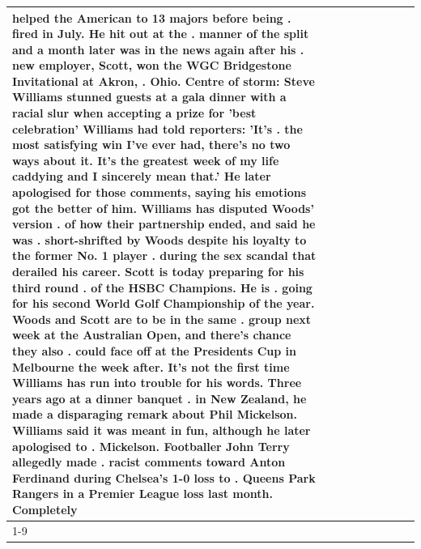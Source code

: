 \begin{table}[H]
\begin{tabular}{lllrlllll}
helped the American to 13 majors before being . fired in July. He hit out at the . manner of the split and a month later was in the news again after his . new employer, Scott, won the WGC Bridgestone Invitational at Akron, . Ohio. Centre of storm: Steve Williams stunned guests at a gala dinner with a racial slur when accepting a prize for 'best celebration' Williams had told reporters: 'It's . the most satisfying win I've ever had, there's no two ways about it. It's the greatest week of my life caddying and I sincerely mean that.' He later apologised for those comments, saying his emotions got the better of him. Williams has disputed Woods' version . of how their partnership ended, and said he was . short-shrifted by Woods despite his loyalty to the former No. 1 player . during the sex scandal that derailed his career. Scott is today preparing for his third round . of the HSBC Champions. He is . going for his second World Golf Championship of the year. Woods and Scott are to be in the same . group next week at the Australian Open, and there's chance they also . could face off at the Presidents Cup in Melbourne the week after. It's not the first time Williams has run into trouble for his words. Three years ago at a dinner banquet . in New Zealand, he made a disparaging remark about Phil Mickelson. Williams said it was meant in fun, although he later apologised to . Mickelson. Footballer John Terry allegedly made . racist comments toward Anton Ferdinand during Chelsea's 1-0 loss to . Queens Park Rangers in a Premier League loss last month. Completely \\
\cline{1-9}

\end{tabular}
\end{table}

